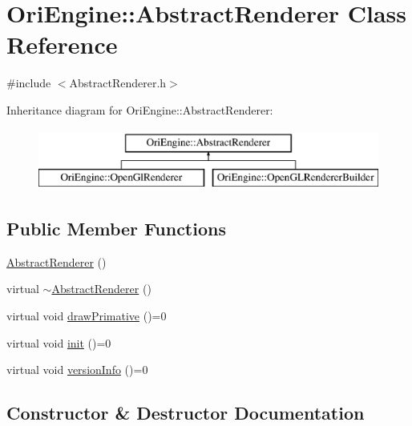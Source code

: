 \hypertarget{class_ori_engine_1_1_abstract_renderer}{}\section{Ori\+Engine\+:\+:Abstract\+Renderer Class Reference}
\label{class_ori_engine_1_1_abstract_renderer}


{\ttfamily \#include $<$Abstract\+Renderer.\+h$>$}

Inheritance diagram for Ori\+Engine\+:\+:Abstract\+Renderer\+:\begin{figure}[H]
\begin{center}
\leavevmode
\includegraphics[height=2.000000cm]{class_ori_engine_1_1_abstract_renderer}
\end{center}
\end{figure}
\subsection*{Public Member Functions}
\begin{DoxyCompactItemize}
\item 
\hyperlink{class_ori_engine_1_1_abstract_renderer_ad9010e136537af7bce43e5334868f69b}{Abstract\+Renderer} ()
\item 
virtual \hyperlink{class_ori_engine_1_1_abstract_renderer_a7bdef22326c436a4152632180d98bc6e}{$\sim$\+Abstract\+Renderer} ()
\item 
virtual void \hyperlink{class_ori_engine_1_1_abstract_renderer_aece5371f0d8b99e6ee456845aba89f8d}{draw\+Primative} ()=0
\item 
virtual void \hyperlink{class_ori_engine_1_1_abstract_renderer_a2af2aba80028b0aa4cca39097e1fdf6d}{init} ()=0
\item 
virtual void \hyperlink{class_ori_engine_1_1_abstract_renderer_a978fc31cfc5fc8c2cafa3d33367fdb32}{version\+Info} ()=0
\end{DoxyCompactItemize}


\subsection{Constructor \& Destructor Documentation}
\hypertarget{class_ori_engine_1_1_abstract_renderer_ad9010e136537af7bce43e5334868f69b}{}\label{class_ori_engine_1_1_abstract_renderer_ad9010e136537af7bce43e5334868f69b} 
